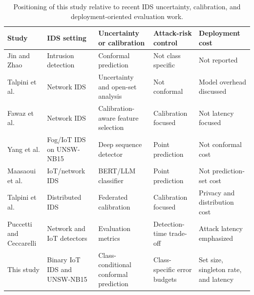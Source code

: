 \begin{table}[t]
\centering
\scriptsize
\setlength{\tabcolsep}{3pt}
\begin{tabular}{@{}>{\raggedright\arraybackslash}p{2.8cm}>{\raggedright\arraybackslash}p{3.0cm}>{\raggedright\arraybackslash}p{3.2cm}>{\raggedright\arraybackslash}p{2.5cm}>{\raggedright\arraybackslash}p{2.5cm}@{}}
\toprule
Study & IDS setting & Uncertainty or calibration & Attack-risk control & Deployment cost \\
\midrule
Jin and Zhao \cite{jin2022highreliability} & Intrusion detection & Conformal prediction & Not class specific & Not reported \\
Talpini et al. \cite{talpini2024trustworthiness} & Network IDS & Uncertainty and open-set analysis & Not conformal & Model overhead discussed \\
Fawaz et al. \cite{fawaz2025calibrated} & Network IDS & Calibration-aware feature selection & Calibration focused & Not latency focused \\
Yang et al. \cite{yang2023bilstmattention} & Fog/IoT IDS on UNSW-NB15 & Deep sequence detector & Point prediction & Not conformal cost \\
Maasaoui et al. \cite{maasaoui2024llmids} & IoT/network IDS & BERT/LLM classifier & Point prediction & Not prediction-set cost \\
Talpini et al. \cite{talpini2025federated} & Distributed IDS & Federated calibration & Calibration focused & Privacy and distribution cost \\
Puccetti and Ceccarelli \cite{puccetti2026latencies} & Network and IoT detectors & Evaluation metrics & Detection-time trade-off & Attack latency emphasized \\
This study & Binary IoT IDS and UNSW-NB15 & Class-conditional conformal prediction & Class-specific error budgets & Set size, singleton rate, and latency \\
\bottomrule
\end{tabular}
\caption{Positioning of this study relative to recent IDS uncertainty, calibration, and deployment-oriented evaluation work.}
\label{tab:related-work-matrix}
\end{table}
